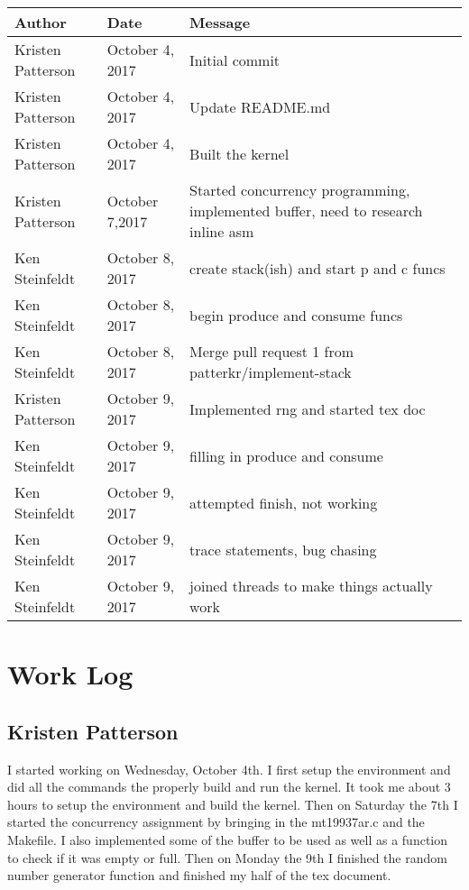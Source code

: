 \documentclass[10pt,letterpaper,onecolumn,draftclsnofoot]{IEEEtran}
\begin{document}
\begin{center}
	\begin{tabular}{|l|l|l|}
		\hline
		\textbf{Author} & \textbf{Date} & \textbf{Message} \\ \hline
		Kristen Patterson & October 4, 2017 & Initial commit \\ \hline
		Kristen Patterson & October 4, 2017 & Update README.md \\ \hline
		Kristen Patterson & October 4, 2017 & Built the kernel \\ \hline
		Kristen Patterson & October 7,2017 & Started concurrency programming, implemented buffer, need to research inline asm \\ \hline
		Ken Steinfeldt & October 8, 2017 & create stack(ish) and start p and c funcs \\ \hline
		Ken Steinfeldt & October 8, 2017 & begin produce and consume funcs \\ \hline
		Ken Steinfeldt & October 8, 2017 & Merge pull request 1 from patterkr/implement-stack \\ \hline
		Kristen Patterson & October 9, 2017 & Implemented rng and started tex doc \\ \hline
		Ken Steinfeldt & October 9, 2017 & filling in produce and consume \\ \hline
		Ken Steinfeldt & October 9, 2017 & attempted finish, not working \\ \hline
		Ken Steinfeldt & October 9, 2017 & trace statements, bug chasing \\ \hline
		Ken Steinfeldt & October 9, 2017 & joined threads to make things actually work \\ \hline
	\end{tabular}
\end{center}

\section{Work Log}
\subsection{Kristen Patterson}
I started working on Wednesday, October 4th. I first setup the environment and 
did all the commands the properly build and run the kernel. It took me about 
3 hours to setup the environment and build the kernel. Then on Saturday the 7th
I started the concurrency assignment by bringing in the mt19937ar.c and the 
Makefile. I also implemented some of the buffer to be used as well as a 
function to check if it was empty or full. Then on Monday the 9th I finished 
the random number generator function and finished my half of the tex document.
\end{document}
